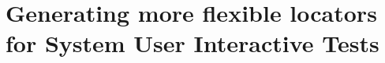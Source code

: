 \chapter{Generating more flexible locators for System User Interactive Tests}
\label{chap:flexible-locators-system-user-interactive-tests}






